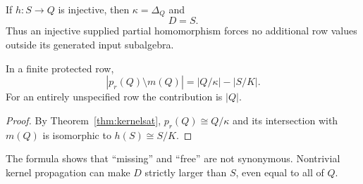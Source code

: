 \begin{corollary}\label{cor:injective}
If $h:S\to Q$ is injective, then $\kappa=\Delta_Q$ and
\[
D=S.
\]
Thus an injective supplied partial homomorphism forces no additional row values outside its generated input subalgebra.
\end{corollary}

\begin{corollary}\label{cor:count}
In a finite protected row,
\[
|p_r(Q)\setminus m(Q)|
=
|Q/\kappa|-|S/K|.
\]
For an entirely unspecified row the contribution is $|Q|$.
\end{corollary}

\begin{proof}
By Theorem~\ref{thm:kernelsat}, $p_r(Q)\cong Q/\kappa$ and its intersection with $m(Q)$ is isomorphic to $h(S)\cong S/K$.
\end{proof}

The formula shows that ``missing'' and ``free'' are not synonymous.  Nontrivial kernel propagation can make $D$ strictly larger than $S$, even equal to all of $Q$.
